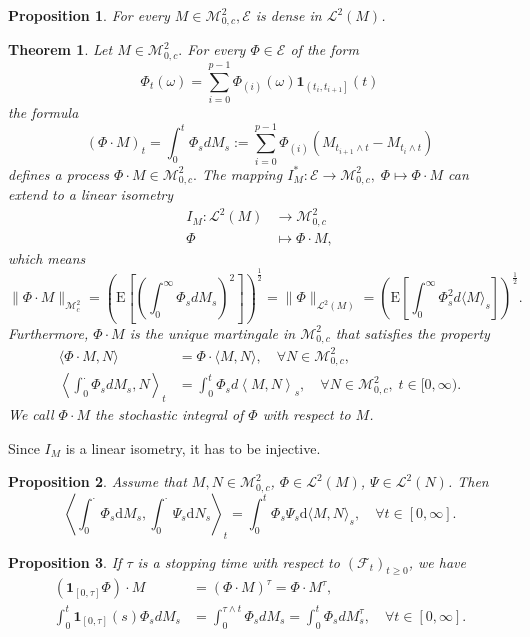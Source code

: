 \documentclass{report}
\newtheorem{proposition}{Proposition}[section]
\newtheorem{theorem}{Theorem}[section]
\theoremstyle{nonumberplain}
\begin{document}
\begin{proposition}
For every $M \in \mathscr{M}^2_{0,c}, \mathscr{E}$ is dense in $\mathscr{L}^{2}(M)$.
\end{proposition}

\begin{theorem}
Let $M \in \mathscr{M}^2_{0,c} .$ For every $\Phi \in \mathscr{E}$ of the form
\[
\Phi_{t}(\omega)=\sum_{i=0}^{p-1} \Phi_{(i)}(\omega) \mathbf{1}_{\left(t_{i}, t_{i+1}\right]}(t)
\]
the formula
\[
(\Phi \cdot M)_{t}=\int_{0}^{t}\Phi_sdM_s:=\sum_{i=0}^{p-1} \Phi_{(i)}\left(M_{t_{i+1} \wedge t}-M_{t_{i} \wedge t}\right)
\]
defines a process $\Phi \cdot M \in \mathscr{M}^2_{0,c}.$ The mapping $I_M^*:\mathscr{E}\to\mathscr{M}^2_{0,c},\;\Phi \mapsto \Phi \cdot M$ can extend to a linear isometry
\begin{align*}
I_M:\mathscr{L}^{2}(M)&\longrightarrow\mathscr{M}^2_{0,c}\\
\Phi &\longmapsto \Phi \cdot M,
\end{align*}
which means
\[
\|\Phi \cdot M\|_{\mathscr{M}^2_c}=\left(\mathrm{E}\left[\left(\int_{0}^{\infty}\Phi_sdM_s\right)^2\right]\right)^{\tfrac{1}{2}}=\|\Phi\|_{\mathscr{L}^2(M)}=\left(\mathrm{E}\left[\int_{0}^{\infty} \Phi_{s}^{2} d\langle M\rangle_{s}\right]\right)^{\tfrac{1}{2}}.
\]
Furthermore, $\Phi \cdot M$ is the unique martingale in $\mathscr{M}^2_{0,c}$ that satisfies the property
\begin{align*}
\langle \Phi \cdot M, N\rangle&= \Phi \cdot\langle M, N\rangle, \quad \forall N \in\mathscr{M}^2_{0,c},\\
\left\langle \int_{0}^{\cdot}\Phi_sdM_s, N\right\rangle_t&= \int_{0}^{t}\Phi_sd\left\langle M, N\right\rangle_s, \quad \forall N \in\mathscr{M}^2_{0,c},\;t\in[0,\infty).
\end{align*}
We call $\Phi \cdot M$ the stochastic integral of $\Phi$ with respect to $M$.
\end{theorem}

Since $I_M$ is a linear isometry, it has to be injective.

\begin{proposition}
	Assume that $M,N\in\mathscr{M}^2_{0,c}$, $\Phi\in\mathscr{L}^2(M)$, $\Psi\in\mathscr{L}^2(N)$. Then
	\[
	\left\langle\int_{0}^\cdot \Phi_{s} \mathrm{d} M_{s}, \int_{0}^\cdot \Psi_{s} \mathrm{d} N_{s}\right\rangle_{t}=\int_{0}^{t} \Phi_{s}\Psi_{s} \mathrm{d}\langle M, N\rangle_{s},\quad\forall t\in[0,\infty].
	\]
\end{proposition}

\begin{proposition}
If $\tau$ is a stopping time with respect to $(\mathcal{F}_t)_{t\ge0}$, we have
\begin{align*}
\left(\mathbf{1}_{[0, \tau]} \Phi\right) \cdot M&=(\Phi \cdot M)^{\tau}=\Phi \cdot M^{\tau},\\
\int_{0}^{t}\mathbf{1}_{[0, \tau]}(s)\Phi_sdM_s&=\int_{0}^{\tau\wedge t}\Phi_sdM_s=\int_{0}^{ t}\Phi_sdM_s^{\tau},\quad\forall t\in[0,\infty].
\end{align*}
\end{proposition}
\end{document}

